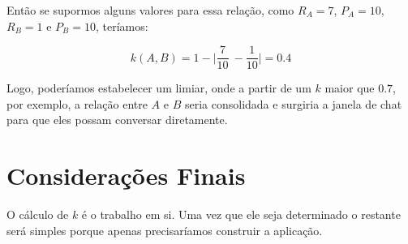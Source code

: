 \documentclass[a4paper, 11pt]{article} %
\begin{document}
Então se supormos alguns valores para essa relação, como $R_A = 7$, $P_A=10$, $R_B = 1$ e $P_B = 10$, teríamos:

\[ k(A,B) = 1 - \bigg|\frac{7}{10}\ - \frac{1}{10}\bigg| = 0.4\]

Logo, poderíamos estabelecer um limiar, onde a partir de um $k$ maior que $0.7$, por exemplo, a relação entre $A$ e $B$ seria consolidada e surgiria a janela de chat para que eles possam conversar diretamente.


\section*{Considerações Finais}

O cálculo de $k$ é o trabalho em si. Uma vez que ele seja determinado o restante será simples porque apenas precisaríamos construir a aplicação. 
\end{document}
